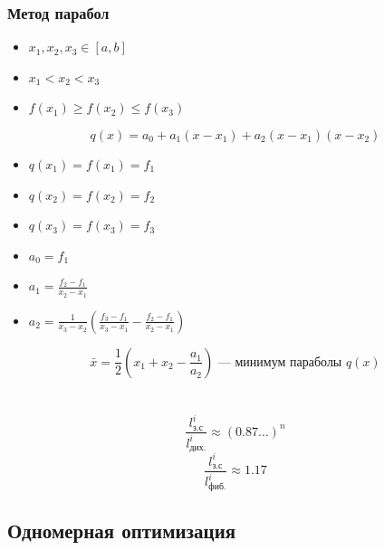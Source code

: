 \documentclass[oneside]{book}
\theoremstyle{plain}
\theoremstyle{remark}
\theoremstyle{definition}
\begin{document}
\subsection{Метод парабол}
\label{sec:org3d3d562}
\begin{itemize}
\item \(x_1, x_2, x_3 \in [a, b]\)
\item \(x_1 < x_2 < x_3\)
\item \(f(x_1) \ge f(x_2) \le f(x_3)\)
\end{itemize}
\[ q(x) = a_0 + a_1(x - x_1) + a_2(x - x_1)(x - x_2) \]
\begin{itemize}
\item \(q(x_1) = f(x_1) = f_1\)
\item \(q(x_2) = f(x_2) = f_2\)
\item \(q(x_3) = f(x_3) = f_3\)
\end{itemize}


\begin{itemize}
\item \(a_0 = f_1\)
\item \(a_1 = \frac{f_2 - f_1}{x_2 - x_1}\)
\item \(a_2 = \frac{1}{x_3 - x_2}\left(\frac{f_3 - f_1}{x_3 - x_1} - \frac{f_2 - f_1}{x_2 - x_1}\right)\)
\end{itemize}
\[ \bar{x} = \frac{1}{2}\left(x_1 + x_2 - \frac{a_1}{a_2}\right)\text{ --- минимум параболы } q(x) \]
\chapter{}
\label{sec:org3d93a15}
\[ \frac{l_\text{з.с}^i}{l_\text{дих.}^i} \approx (0.87\dots)^n \] \[
\frac{l_\text{з.с}^i}{l_\text{фиб.}^i} \approx 1.17 \]

\section{Одномерная оптимизация}
\label{sec:orge571044}
\end{document}
